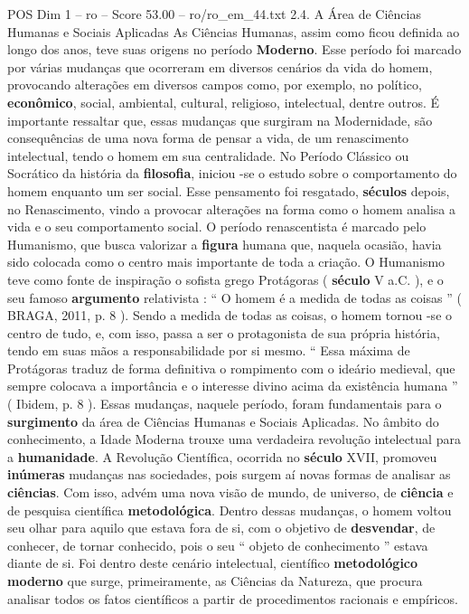 \begin{textsample}{POS Dim 1 – ro – Score 53.00 – ro/ro\_em\_44.txt}  \label{ex:f1_pos_140}
2.4.
A Área de Ciências Humanas e Sociais Aplicadas As Ciências Humanas, assim como ficou definida ao longo dos anos, teve suas origens no período \textbf{Moderno}.
Esse período foi marcado por várias mudanças que ocorreram em diversos cenários da vida do homem, provocando alterações em diversos campos como, por exemplo, no político, \textbf{econômico}, social, ambiental, cultural, religioso, intelectual, dentre outros.
É importante ressaltar que, essas mudanças que surgiram na Modernidade, são consequências de uma nova forma de pensar a vida, de um renascimento intelectual, tendo o homem em sua centralidade.
No Período Clássico ou Socrático da história da \textbf{filosofia}, iniciou -se o estudo sobre o comportamento do homem enquanto um ser social.
Esse pensamento foi resgatado, \textbf{séculos} depois, no Renascimento, vindo a provocar alterações na forma como o homem analisa a vida e o seu comportamento social.
O período renascentista é marcado pelo Humanismo, que busca valorizar a \textbf{figura} humana que, naquela ocasião, havia sido colocada como o centro mais importante de toda a criação.
O Humanismo teve como fonte de inspiração o sofista grego Protágoras ( \textbf{século} V a.C. ), e o seu famoso \textbf{argumento} relativista : “ O homem é a medida de todas as coisas ” ( BRAGA, 2011, p. 8 ).
Sendo a medida de todas as coisas, o homem tornou -se o centro de tudo, e, com isso, passa a ser o protagonista de sua própria história, tendo em suas mãos a responsabilidade por si mesmo. “ Essa máxima de Protágoras traduz de forma definitiva o rompimento com o ideário medieval, que sempre colocava a importância e o interesse divino acima da existência humana ” ( Ibidem, p. 8 ).
Essas mudanças, naquele período, foram fundamentais para o \textbf{surgimento} da área de Ciências Humanas e Sociais Aplicadas.
No âmbito do conhecimento, a Idade Moderna trouxe uma verdadeira revolução intelectual para a \textbf{humanidade}.
A Revolução Científica, ocorrida no \textbf{século} XVII, promoveu \textbf{inúmeras} mudanças nas sociedades, pois surgem aí novas formas de analisar as \textbf{ciências}.
Com isso, advém uma nova visão de mundo, de universo, de \textbf{ciência} e de pesquisa científica \textbf{metodológica}.
Dentro dessas mudanças, o homem voltou seu olhar para aquilo que estava fora de si, com o objetivo de \textbf{desvendar}, de conhecer, de tornar conhecido, pois o seu “ objeto de conhecimento ” estava diante de si.
Foi dentro deste cenário intelectual, científico \textbf{metodológico} \textbf{moderno} que surge, primeiramente, as Ciências da Natureza, que procura analisar todos os fatos científicos a partir de procedimentos racionais e empíricos.

\end{textsample}
